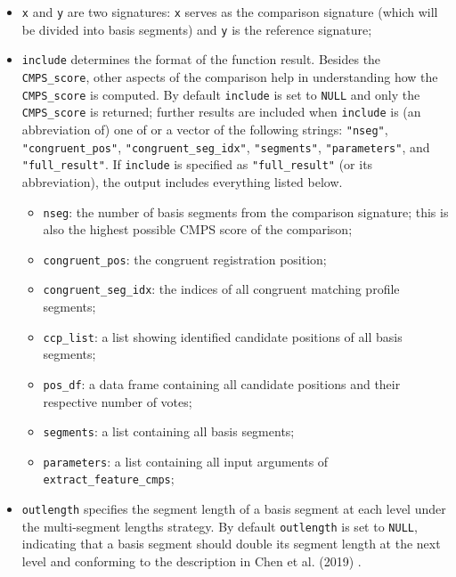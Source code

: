 \begin{itemize}
\item
  \texttt{x} and \texttt{y} are two signatures: \texttt{x} serves as the comparison signature (which will be divided into basis segments) and \texttt{y} is the reference signature;
\item
  \texttt{include} determines the format of the function result.
  Besides the \texttt{CMPS\_score}, other aspects of the comparison help in understanding how the \texttt{CMPS\_score} is computed.
  By default \texttt{include} is set to \texttt{NULL} and only the \texttt{CMPS\_score} is returned; further results are included when \texttt{include} is (an abbreviation of) one of or a vector of the following strings: \texttt{"nseg"}, \texttt{"congruent\_pos"}, \texttt{"congruent\_seg\_idx"}, \texttt{"segments"}, \texttt{"parameters"}, and \texttt{"full\_result"}.
  If \texttt{include} is specified as \texttt{"full\_result"} (or its abbreviation), the output includes everything listed below.

  \begin{itemize}
  \tightlist
  \item
    \texttt{nseg}: the number of basis segments from the comparison signature; this is also the highest possible CMPS score of the comparison;
  \item
    \texttt{congruent\_pos}: the congruent registration position;
  \item
    \texttt{congruent\_seg\_idx}: the indices of all congruent matching profile segments;
  \item
    \texttt{ccp\_list}: a list showing identified candidate positions of all basis segments;
  \item
    \texttt{pos\_df}: a data frame containing all candidate positions and their respective number of votes;
  \item
    \texttt{segments}: a list containing all basis segments;
  \item
    \texttt{parameters}: a list containing all input arguments of \texttt{extract\_feature\_cmps};
  \end{itemize}
\item
  \texttt{outlength} specifies the segment length of a basis segment at each level under the multi-segment lengths strategy.
  By default \texttt{outlength} is set to \texttt{NULL}, indicating that a basis segment should double its segment length at the next level and conforming to the description in Chen et al. (2019) .
\end{itemize}

